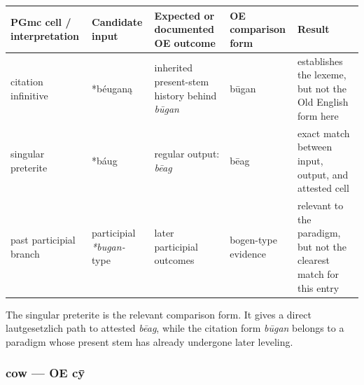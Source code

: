 \documentclass[
  british,
  a4paper,
]{article}
\newcounter{none} %
\begin{document}
{\def\LTcaptype{none} %
\begin{longtable}[]{@{}
  >{\raggedright\arraybackslash}p{}
  >{\raggedright\arraybackslash}p{}
  >{\raggedright\arraybackslash}p{}
  >{\raggedright\arraybackslash}p{}
  >{\raggedright\arraybackslash}p{}@{}}
\toprule\noalign{}
\begin{minipage}[b]{\linewidth}\raggedright
PGmc cell / interpretation
\end{minipage} & \begin{minipage}[b]{\linewidth}\raggedright
Candidate input
\end{minipage} & \begin{minipage}[b]{\linewidth}\raggedright
Expected or documented OE outcome
\end{minipage} & \begin{minipage}[b]{\linewidth}\raggedright
OE comparison form
\end{minipage} & \begin{minipage}[b]{\linewidth}\raggedright
Result
\end{minipage} \\
\midrule\noalign{}
\endhead
\bottomrule\noalign{}
\endlastfoot
citation infinitive & *béuganą & inherited present-stem history behind
\emph{būgan} & būgan & establishes the lexeme, but not the Old English
form here \\
singular preterite & *báug & regular output: \emph{bēag} & bēag & exact
match between input, output, and attested cell \\
past participial branch & participial \emph{*bugan-} type & later
participial outcomes & bogen-type evidence & relevant to the paradigm,
but not the clearest match for this entry \\
\end{longtable}
}

The singular preterite is the relevant comparison form. It gives a
direct lautgesetzlich path to attested \emph{bēag}, while the citation
form \emph{būgan} belongs to a paradigm whose present stem has already
undergone later leveling.

\subsubsection{cow --- OE cȳ}\label{cow-oe-cux233}
\end{document}
